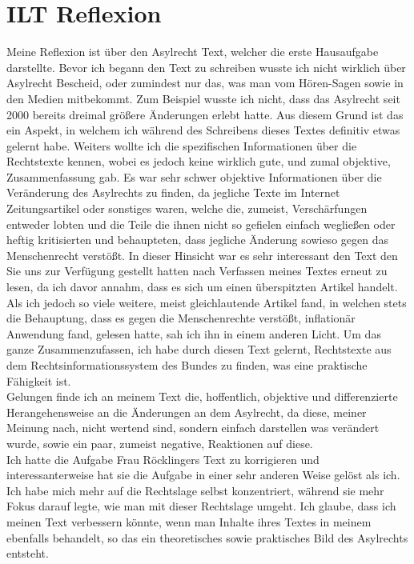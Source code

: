 \documentclass{article}
\begin{document}
	\section*{ILT Reflexion}
	Meine Reflexion ist über den Asylrecht Text, welcher die erste Hausaufgabe darstellte. Bevor ich begann den Text zu schreiben wusste ich nicht wirklich über Asylrecht Bescheid, oder zumindest nur das, was man vom Hören-Sagen sowie in den Medien mitbekommt. Zum Beispiel wusste ich nicht, dass das Asylrecht seit 2000 bereits dreimal größere Änderungen erlebt hatte. Aus diesem Grund ist das ein Aspekt, in welchem ich während des Schreibens dieses Textes definitiv etwas gelernt habe. Weiters wollte ich die spezifischen Informationen über die Rechtstexte kennen, wobei es jedoch keine wirklich gute, und zumal objektive, Zusammenfassung gab. Es war sehr schwer objektive Informationen über die Veränderung des Asylrechts zu finden, da jegliche Texte im Internet Zeitungsartikel oder sonstiges waren, welche die, zumeist, Verschärfungen entweder lobten und die Teile die ihnen nicht so gefielen einfach wegließen oder heftig kritisierten und behaupteten, dass jegliche Änderung sowieso gegen das Menschenrecht verstößt. In dieser Hinsicht war es sehr interessant den Text den Sie uns zur Verfügung gestellt hatten nach Verfassen meines Textes erneut zu lesen, da ich davor annahm, dass es sich um einen überspitzten Artikel handelt. Als ich jedoch so viele weitere, meist gleichlautende Artikel fand, in welchen stets die Behauptung, dass es gegen die Menschenrechte verstößt, inflationär Anwendung fand, gelesen hatte, sah ich ihn in einem anderen Licht. Um das ganze Zusammenzufassen, ich habe durch diesen Text gelernt, Rechtstexte aus dem Rechtsinformationssystem des Bundes zu finden, was eine praktische Fähigkeit ist. \\
	Gelungen finde ich an meinem Text die, hoffentlich, objektive und differenzierte Herangehensweise an die Änderungen an dem Asylrecht, da diese, meiner Meinung nach, nicht wertend sind, sondern einfach darstellen was verändert wurde, sowie ein paar, zumeist negative, Reaktionen auf diese.  \\
	Ich hatte die Aufgabe Frau Röcklingers Text zu korrigieren und interessanterweise hat sie die Aufgabe in einer sehr anderen Weise gelöst als ich. Ich habe mich mehr auf die Rechtslage selbst konzentriert, während sie mehr Fokus darauf legte, wie man mit dieser Rechtslage umgeht. Ich glaube, dass ich meinen Text verbessern könnte, wenn man Inhalte ihres Textes in meinem ebenfalls behandelt, so das ein theoretisches sowie praktisches Bild des Asylrechts entsteht. \\
\end{document}
